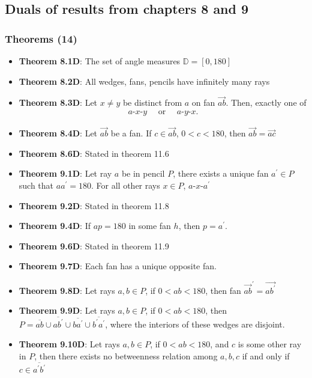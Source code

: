 \documentclass{report}
\begin{document}
    \pagebreak 
    \subsection{Duals of results from chapters 8 and 9}
    \bigbreak \noindent 
    \subsubsection{Theorems (14)}
    \begin{itemize}
        \item \textbf{Theorem 8.1D}: The set of angle measures $\mathbb{D} = [0,180]$
        \item \textbf{Theorem 8.2D}: All wedges, fans, pencils have infinitely many rays
        \item \textbf{Theorem 8.3D}: Let $x\ne y$ be distinct from $a$ on fan $\overrightarrow{ab}$. Then, exactly one of 
            \begin{align*}
                a\text{-}x\text{-}y \quad \text{ or } \quad a\text{-}y\text{-}x
            .\end{align*}
        \item \textbf{Theorem 8.4D}: Let $\overrightarrow{ab}$ be a fan. If $c \in \overrightarrow{ab}$, $0 < c < 180$, then $\overrightarrow{ab} = \overrightarrow{ac}$
        \item \textbf{Theorem 8.6D}: Stated in theorem 11.6
        \item \textbf{Theorem 9.1D}: Let ray $a$ be in pencil $P$, there exists a unique fan $a^{\prime} \in P$ such that $aa^{\prime} = 180$. For all other rays $x\in P$, $ a\text{-}x\text{-}a^{\prime} $
        \item \textbf{Theorem 9.2D}: Stated in theorem 11.8
        \item \textbf{Theorem 9.4D}: If $ap = 180$ in some fan $h$, then $p = a^{\prime}$.
        \item \textbf{Theorem 9.6D}: Stated in theorem 11.9
        \item \textbf{Theorem 9.7D}: Each fan has a unique opposite fan.
        \item \textbf{Theorem 9.8D}: Let rays $a,b \in P$, if $0 < ab < 180$, then fan $\overrightarrow{ab}^{\prime} = \overrightarrow{ab^{\prime}} $
        \item \textbf{Theorem 9.9D}: Let rays $a,b \in P$, if $0 < ab < 180$, then $P = \overline{ab} \cup \overline{ab^{\prime}} \cup \overline{ba^{\prime}} \cup \overline{b^{\prime}a^{\prime}}$, where the interiors of these wedges are disjoint.
        \item \textbf{Theorem 9.10D}: Let rays $a,b \in P$, if $0 < ab < 180$, and $c$ is some other ray in $P$, then there exists no betweenness relation among $a,b,c$ if and only if $c \in \overline{a^{\prime}b^{\prime}} $
    \end{itemize}
\end{document}
